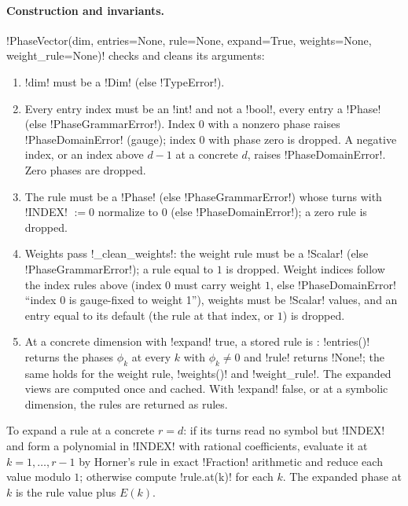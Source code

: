 \paragraph{Construction and invariants.}
\py!PhaseVector(dim, entries=None, rule=None, expand=True, weights=None, weight_rule=None)! checks and cleans its arguments:
\begin{enumerate}
\item \code!dim! must be a \py!Dim! (else \py!TypeError!).
\item Every entry index must be an \py!int! and not a \py!bool!, every entry a \py!Phase! (else \py!PhaseGrammarError!). Index $0$ with a nonzero phase raises \py!PhaseDomainError! (gauge); index $0$ with phase zero is dropped. A negative index, or an index above $d-1$ at a concrete $d$, raises \py!PhaseDomainError!. Zero phases are dropped.
\item The rule must be a \py!Phase! (else \py!PhaseGrammarError!) whose turns with \py!INDEX! $:=0$ normalize to $0$ (else \py!PhaseDomainError!); a zero rule is dropped.
\item Weights pass \py!_clean_weights!: the weight rule must be a \py!Scalar! (else \py!PhaseGrammarError!); a rule equal to $1$ is dropped. Weight indices follow the index rules above (index $0$ must carry weight $1$, else \py!PhaseDomainError! ``index 0 is gauge-fixed to weight 1''), weights must be \py!Scalar! values, and an entry equal to its default (the rule at that index, or $1$) is dropped.
\item At a concrete dimension with \code!expand! true, a stored rule is : \py!entries()! returns the phases $\phi_k$ at every $k$ with $\phi_k\ne 0$ and \py!rule! returns \py!None!; the same holds for the weight rule, \py!weights()! and \py!weight_rule!. The expanded views are computed once and cached. With \code!expand! false, or at a symbolic dimension, the rules are returned as rules.
\end{enumerate}

\begin{algorithm}\label{alg:algebra-rule-values}
To expand a rule at a concrete $r=d$: if its turns read no symbol but \py!INDEX! and form a polynomial in \py!INDEX! with rational coefficients, evaluate it at $k=1,\ldots,r-1$ by Horner's rule in exact \py!Fraction! arithmetic and reduce each value modulo $1$; otherwise compute \py!rule.at(k)! for each $k$. The expanded phase at $k$ is the rule value plus $E(k)$.
\end{algorithm}


